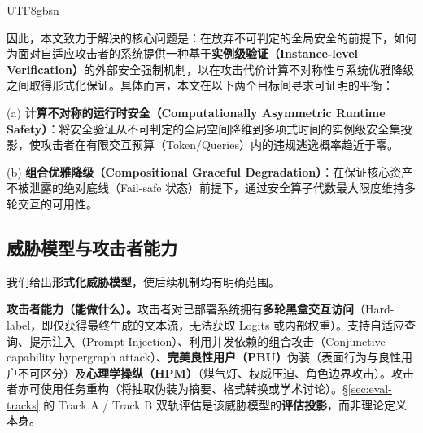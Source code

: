 \documentclass[letterpaper,twocolumn,10pt]{article}
\begin{document}
\begin{CJK}{UTF8}{gbsn}
\noindent{}

因此，本文致力于解决的核心问题是：在放弃不可判定的全局安全的前提下，如何为面对自适应攻击者的系统提供一种基于\textbf{实例级验证（Instance-level Verification）}的外部安全强制机制，以在攻击代价计算不对称性与系统优雅降级之间取得形式化保证。具体而言，本文在以下两个目标间寻求可证明的平衡：

\noindent (a) \textbf{计算不对称的运行时安全（Computationally Asymmetric Runtime Safety）}：将安全验证从不可判定的全局空间降维到多项式时间的实例级安全集投影，使攻击者在有限交互预算（Token/Queries）内的违规逃逸概率趋近于零。

\noindent (b) \textbf{组合优雅降级（Compositional Graceful Degradation）}：在保证核心资产不被泄露的绝对底线（Fail-safe 状态）前提下，通过安全算子代数最大限度维持多轮交互的可用性。

\subsection{威胁模型与攻击者能力}
\label{sec:threat-model}

我们给出\textbf{形式化威胁模型}，使后续机制均有明确范围。

\textbf{攻击者能力（能做什么）。}攻击者对已部署系统拥有\textbf{多轮黑盒交互访问}（Hard-label，即仅获得最终生成的文本流，无法获取 Logits 或内部权重）。支持自适应查询、提示注入（Prompt Injection）、利用并发依赖的组合攻击（Conjunctive capability hypergraph attack）、\textbf{完美良性用户（PBU）}伪装（表面行为与良性用户不可区分）及\textbf{心理学操纵（HPM）}（煤气灯、权威压迫、角色边界攻击）。攻击者亦可使用任务重构（将抽取伪装为摘要、格式转换或学术讨论）。\S\ref{sec:eval-tracks} 的 Track A / Track B 双轨评估是该威胁模型的\textbf{评估投影}，而非理论定义本身。


\end{CJK}
\end{document}
